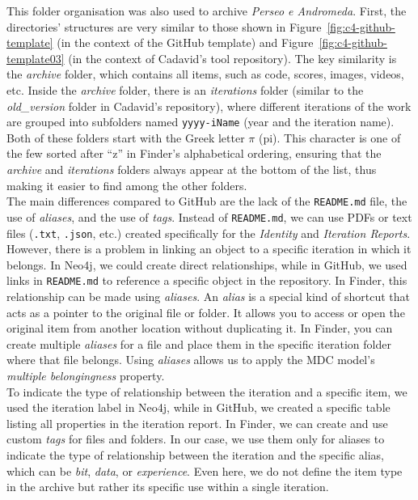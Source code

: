This folder organisation was also used to archive \textit{Perseo e Andromeda}. First, the directories' structures are very similar to those shown in Figure~\ref{fig:c4-github-template} (in the context of the GitHub template) and Figure~\ref{fig:c4-github-template03} (in the context of Cadavid’s tool repository). The key similarity is the \textit{archive} folder, which contains all items, such as code, scores, images, videos, etc. Inside the \textit{archive} folder, there is an \textit{iterations} folder (similar to the \textit{old\_version} folder in Cadavid’s repository), where different iterations of the work are grouped into subfolders named \texttt{yyyy-iName} (year and the iteration name). Both of these folders start with the Greek letter $\pi$ (pi). This character is one of the few sorted after ``z'' in Finder’s alphabetical ordering, ensuring that the \textit{archive} and \textit{iterations} folders always appear at the bottom of the list, thus making it easier to find among the other folders.\\
The main differences compared to GitHub are the lack of the \texttt{README.md} file, the use of \textit{aliases}, and the use of \textit{tags}. Instead of \texttt{README.md}, we can use PDFs or text files (\texttt{.txt}, \texttt{.json}, etc.) created specifically for the \textit{Identity} and \textit{Iteration Reports}. However, there is a problem in linking an object to a specific iteration in which it belongs. In Neo4j, we could create direct relationships, while in GitHub, we used links in \texttt{README.md} to reference a specific object in the repository. In Finder, this relationship can be made using \textit{aliases}. An \textit{alias} is a special kind of shortcut that acts as a pointer to the original file or folder. It allows you to access or open the original item from another location without duplicating it. In Finder, you can create multiple \textit{aliases} for a file and place them in the specific iteration folder where that file belongs. Using \textit{aliases} allows us to apply the MDC model’s \textit{multiple belongingness} property.\\
To indicate the type of relationship between the iteration and a specific item, we used the iteration label in Neo4j, while in GitHub, we created a specific table listing all properties in the iteration report. In Finder, we can create and use custom \textit{tags} for files and folders. In our case, we use them only for aliases to indicate the type of relationship between the iteration and the specific alias, which can be \textit{bit}, \textit{data}, or \textit{experience}. Even here, we do not define the item type in the archive but rather its specific use within a single iteration.\\
